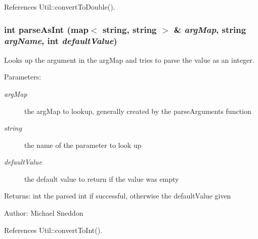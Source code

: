 References Util::convertToDouble().
\subsubsection[parseAsInt]{\setlength{\rightskip}{0pt plus 5cm}int parseAsInt (map$<$ string, string $>$ \& {\em argMap}, \/  string {\em argName}, \/  int {\em defaultValue})}\label{commandLineParser_8cpp_7e2b760fe8b56a663c12352037277dd0}


Looks up the argument in the argMap and tries to parse the value as an integer. 

\begin{Desc}
\item[Parameters:]
\begin{description}
\item[{\em argMap}]the argMap to lookup, generally created by the parseArguments function \item[{\em string}]the name of the parameter to look up \item[{\em defaultValue}]the default value to return if the value was empty \end{description}
\end{Desc}
\begin{Desc}
\item[Returns:]int the parsed int if successful, otherwise the defaultValue given \end{Desc}
\begin{Desc}
\item[Author:]Michael Sneddon \end{Desc}


References Util::convertToInt().